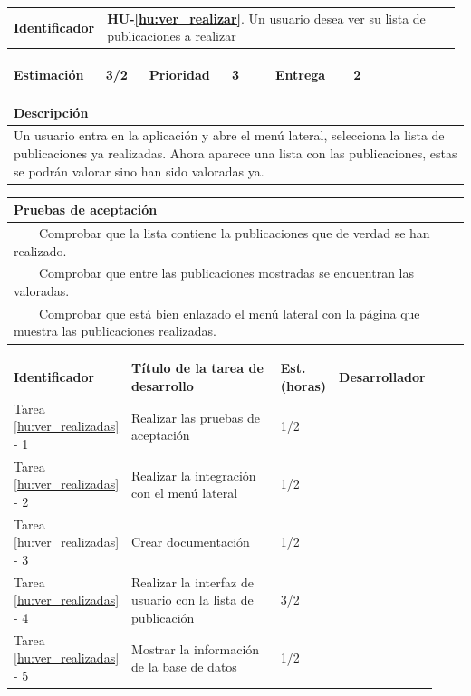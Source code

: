 \documentclass[11pt]{article}
\newcommand{\tabitem}{~~\llap{\textbullet}~~}
\begin{document}
\begin{longtable}{p{0.18\linewidth}|p{0.8\linewidth}}
	\rowcolor{Orange}
	\textbf{Identificador} & \textbf{HU-\ref{hu:ver_realizar}}. Un usuario desea ver su lista de publicaciones a realizar \\  
\end{longtable}
\vspace{-0.8cm}
\begin{longtable}{p{0.18\linewidth}|p{0.1\linewidth}|p{0.18\linewidth}|p{0.1\linewidth}|p{0.18\linewidth}|p{0.1\linewidth}}
	\toprule
	\textbf{Estimación} & 3/2 & \textbf{Prioridad} & 3 & \textbf{Entrega} & 2 \\
	\bottomrule
\end{longtable}
\vspace{-0.8cm}
\begin{longtable}{p{1.028\linewidth}}
	\textbf{Descripción}\\
	\midrule
	Un usuario entra en la aplicación y abre el menú lateral, selecciona la lista de publicaciones ya realizadas. Ahora aparece una lista con las publicaciones, estas se podrán valorar sino han sido valoradas ya. \\
	\bottomrule
\end{longtable}
\vspace{-0.8cm}
\begin{longtable}{p{1.028\linewidth}}
	\textbf{Pruebas de aceptación}\\
	\midrule
	\tabitem Comprobar que la lista contiene la publicaciones que de verdad se han realizado.\\
	\tabitem Comprobar que entre las publicaciones mostradas se encuentran las valoradas.\\
	\tabitem Comprobar que está bien enlazado el menú lateral con la página que muestra las publicaciones realizadas.\\
\end{longtable}
\vspace{-0.8cm}
\begin{longtable}{p{0.18\linewidth}|p{0.48\linewidth}|p{0.1\linewidth}|p{0.17\linewidth}}
	\toprule
	\textbf{Identificador} & \textbf{Título de la tarea de desarrollo} & \textbf{Est. (horas)} & \textbf{Desarrollador} \\
	Tarea \ref{hu:ver_realizadas} - 1 & Realizar las pruebas de aceptación & 1/2 &\\
	Tarea \ref{hu:ver_realizadas} - 2 & Realizar la integración con el menú lateral & 1/2 & \\
	Tarea \ref{hu:ver_realizadas} - 3 & Crear documentación & 1/2 & \\
	Tarea \ref{hu:ver_realizadas} - 4 & Realizar la interfaz de usuario con la lista de publicación & 3/2 &  \\
	Tarea \ref{hu:ver_realizadas} - 5 & Mostrar la información de la base de datos & 1/2 &  \\
	\bottomrule
\end{longtable}
\end{document}
